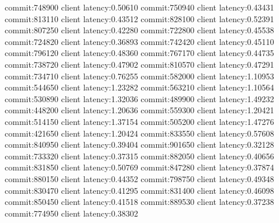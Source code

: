 commit:748900 client latency:0.50610
commit:750940 client latency:0.43431
commit:813110 client latency:0.43512
commit:828100 client latency:0.52391
commit:807250 client latency:0.42280
commit:722800 client latency:0.45538
commit:724820 client latency:0.36893
commit:742420 client latency:0.45110
commit:796120 client latency:0.48360
commit:767170 client latency:0.44735
commit:738720 client latency:0.47902
commit:810570 client latency:0.47291
commit:734710 client latency:0.76255
commit:582000 client latency:1.10953
commit:544650 client latency:1.23282
commit:563210 client latency:1.10564
commit:530890 client latency:1.32036
commit:489900 client latency:1.49232
commit:448200 client latency:1.20636
commit:559300 client latency:1.20421
commit:514150 client latency:1.37154
commit:505200 client latency:1.47276
commit:421650 client latency:1.20424
commit:833550 client latency:0.57608
commit:840950 client latency:0.39404
commit:901650 client latency:0.32128
commit:733320 client latency:0.37315
commit:882050 client latency:0.40656
commit:831850 client latency:0.50769
commit:847280 client latency:0.37874
commit:880150 client latency:0.44352
commit:798750 client latency:0.49348
commit:830470 client latency:0.41295
commit:831400 client latency:0.46098
commit:850450 client latency:0.41518
commit:889530 client latency:0.37238
commit:774950 client latency:0.38302